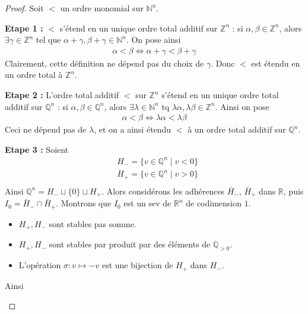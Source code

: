        \begin{proof}
            Soit $<$ un ordre monomial sur $\mathbb{N}^n$.
            \item \textbf{Etape 1 :} $<$ s'étend en un unique ordre total additif sur $\mathbb{Z}^n$ : si $\alpha, \beta \in \mathbb{Z}^n$, alors $\exists \gamma \in \mathbb{Z}^n$ tel que $\alpha + \gamma, \beta + \gamma \in \mathbb{N}^n$. On pose ainsi
            \begin{align*}
                \alpha < \beta \iff \alpha + \gamma < \beta + \gamma 
            \end{align*}
            Clairement, cette définition ne dépend pas du choix de $\gamma$. Donc $<$ est étendu en un ordre total à $\mathbb{Z}^n$.
            \item \textbf{Etape 2 :} L'ordre total additif $<$ sur $\mathbb{Z}^n$ s'étend en un unique ordre total additif sur $\mathbb{Q}^n$ : si $\alpha, \beta \in \mathbb{Q}^n$, alors $\exists \lambda \in \mathbb{N}^n$ tq $\lambda \alpha, \lambda \beta \in \mathbb{Z}^n$. Ainsi on pose 
            \begin{align*}
                \alpha < \beta \iff \lambda \alpha < \lambda \beta
            \end{align*}
            Ceci ne dépend pas de $\lambda$, et on a ainsi étendu $<$ à un ordre total additif sur $\mathbb{Q}^n$.
            \item \textbf{Etape 3 :} Soient
            \begin{align*}
                &H_- =  \{v \in \mathbb{Q}^n \mid v < 0\} \\
                &H_+ =  \{v \in \mathbb{Q}^n \mid v > 0\} \\
            \end{align*}
            Ainsi $\mathbb{Q}^n = H_- \sqcup \{0\} \sqcup H_+$. Alors considérons les adhérences $\bar H_-$, $\bar H_+$ dans $\mathbb{R}$, puis $I_0 = \bar H_- \cap \bar H_+$. Montrons que $I_0$ est un sev de $\mathbb{R}^n$ de codimension $1$.
            \begin{itemize}
                \item $H_+, H_-$ sont stables pas somme.
                \item $H_+, H_-$ sont stables par produit par des éléments de $\mathbb{Q}_{>0}$.
                \item L'opération $\sigma : v \mapsto -v$ est une bijection de $H_+$ dans $H_-$.
            \end{itemize}
            Ainsi
            \begin{itemize}

\end{itemize}
\end{proof}
